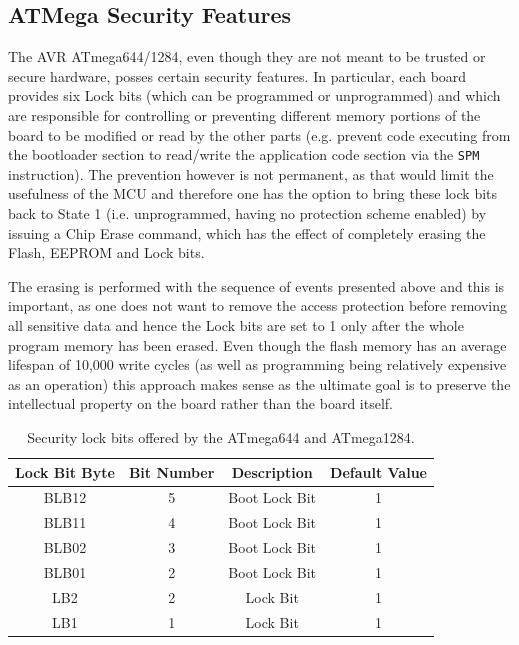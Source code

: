 \documentclass[12pt,a4paper,twocolumn]{article}
\begin{document}
	\subsection{ATMega Security Features}
	
	The AVR ATmega644/1284, even though they are not meant to be trusted or secure hardware, posses certain security features. In particular, each board provides six Lock bits (which can be programmed or unprogrammed) and which are responsible for controlling or preventing different memory portions of the board to be modified or read by the other parts (e.g. prevent code executing from the bootloader section to read/write the application code section via the \texttt{SPM} instruction). The prevention however is not permanent, as that would limit the usefulness of the MCU and therefore one has the option to bring these lock bits back to State 1 (i.e. unprogrammed, having no protection scheme enabled) by issuing a Chip Erase command, which has the effect of completely erasing the Flash, EEPROM and Lock bits.
	
	The erasing is performed with the sequence of events presented above and this is important, as one does not want to remove the access protection before removing all sensitive data and hence the Lock bits are set to 1 only after the whole program memory has been erased. Even though the flash memory has an average lifespan of 10,000 write cycles (as well as programming being relatively expensive as an operation) this approach makes sense as the ultimate goal is to preserve the intellectual property on the board rather than the board itself.
	
	\begin{table}
		\center
		\begin{tabular}{| c | c | c | c |}
			\hline
			\textbf{Lock Bit Byte} & \textbf{Bit Number} & \textbf{Description} & \textbf{Default Value}\\
			\hline \hline
			BLB12 & 5 & Boot Lock Bit & 1\\
			BLB11 & 4 & Boot Lock Bit & 1\\
			BLB02 & 3 & Boot Lock Bit & 1\\
			BLB01 & 2 & Boot Lock Bit & 1\\
			LB2 & 2 & Lock Bit & 1 \\
			LB1 & 1 & Lock Bit & 1 \\
			\hline
		\end{tabular}
		\caption{Security lock bits offered by the ATmega644 and ATmega1284.}
		\label{table:lock_bits}
	\end{table}
	
\end{document}
